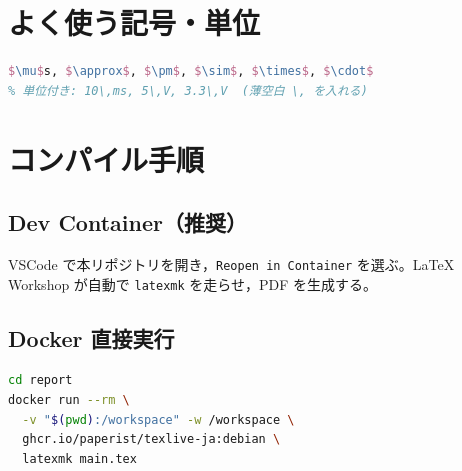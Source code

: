 \section{よく使う記号・単位}

\begin{lstlisting}[language=TeX]
$\mu$s, $\approx$, $\pm$, $\sim$, $\times$, $\cdot$
% 単位付き: 10\,ms, 5\,V, 3.3\,V  (薄空白 \, を入れる)
\end{lstlisting}

\section{コンパイル手順}

\subsection{Dev Container（推奨）}
VSCode で本リポジトリを開き，\verb|Reopen in Container| を選ぶ。LaTeX Workshop が自動で \verb|latexmk| を走らせ，PDF を生成する。

\subsection{Docker 直接実行}
\begin{lstlisting}[language=bash]
cd report
docker run --rm \
  -v "$(pwd):/workspace" -w /workspace \
  ghcr.io/paperist/texlive-ja:debian \
  latexmk main.tex
\end{lstlisting}

